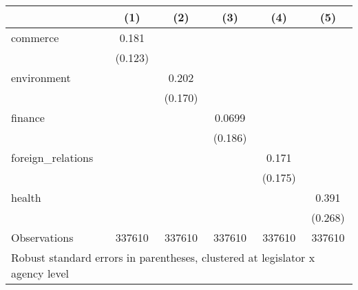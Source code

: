 \begin{tabular}{l*{5}{c}}
\toprule
                    &\multicolumn{1}{c}{(1)}&\multicolumn{1}{c}{(2)}&\multicolumn{1}{c}{(3)}&\multicolumn{1}{c}{(4)}&\multicolumn{1}{c}{(5)}\\
\midrule
commerce            &       0.181&            &            &            &            \\
                    &     (0.123)&            &            &            &            \\
environment         &            &       0.202&            &            &            \\
                    &            &     (0.170)&            &            &            \\
finance             &            &            &      0.0699&            &            \\
                    &            &            &     (0.186)&            &            \\
foreign\_relations   &            &            &            &       0.171&            \\
                    &            &            &            &     (0.175)&            \\
health              &            &            &            &            &       0.391\\
                    &            &            &            &            &     (0.268)\\
\midrule
Observations        &      337610&      337610&      337610&      337610&      337610\\
\bottomrule
\multicolumn{6}{l}{\footnotesize Robust standard errors in parentheses, clustered at legislator x agency level}\\
\end{tabular}
